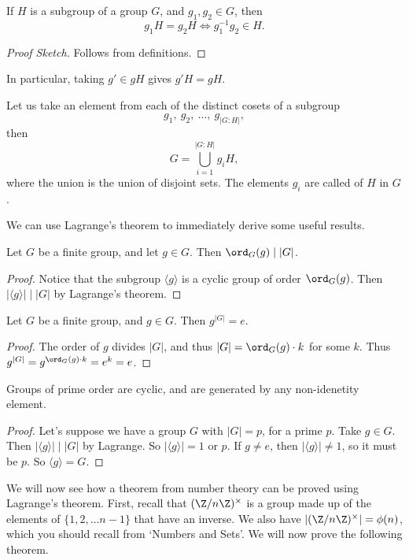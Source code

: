 \documentclass[a4]{scrreprt}
\begin{document}
\begin{proposition}
	If $H$ is a subgroup of a group $G$, and $g_1, g_2 \in G$, then
	$$
	g_1 H = g_2H \iff g_1^{-1} g_2 \in H.
	$$
\end{proposition}
\begin{proof}[Proof Sketch]
	Follows from definitions.
\end{proof}

In particular, taking $g' \in gH$ gives $g'H = gH$.

Let us take an element from each of the distinct cosets of a subgroup
$$
g_1,\ g_2, \ \dots, \ g_{|G:H|},
$$
then
$$
G = \bigcup_{i = 1}^{|G:H|} g_i H,
$$
where the union is the union of disjoint sets. The elements $g_i$ are called  of $H$ in $G$. 

We can use Lagrange's theorem to immediately derive some useful results.

\begin{corollary}
	Let $G$ be a finite group, and let $g \in G$. Then $\ord_G(g) \mid |G|$.
\end{corollary}
\begin{proof}
	Notice that the subgroup $\langle g \rangle$ is a cyclic group of order $\ord_G(g)$. Then $|\langle g \rangle|  \mid |G|$ by Lagrange's theorem.
\end{proof}

\begin{corollary}
	Let $G$ be a finite group, and $g \in G$. Then $g^{|G|} = e$.
\end{corollary}
\begin{proof}
	The order of $g$ divides $|G|$, and thus $|G| = \ord_G(g) \cdot k$ for some $k$. Thus $g^{|G|} = g^{\ord_G(g) \cdot k} = e^k = e$.
\end{proof}

\begin{corollary}\label{cor:primecyclic}
	Groups of prime order are cyclic, and are generated by any non-idenetity element.
\end{corollary}
\begin{proof}
Let's suppose we have a group $G$ with $|G| = p$, for a prime $p$. Take $g \in G$. Then $|\langle g \rangle| \mid |G|$ by Lagrange. So $|\langle g \rangle | = 1$ or $p$. If $g \neq e$, then $|\langle g \rangle |\neq 1$, so it must be $p$. So $\langle g \rangle = G$. 
\end{proof}

We will now see how a theorem from number theory can be proved using Lagrange's theorem. First, recall that $(\Z/n\Z)^\times$ is a group made up of the elements of $\{1, 2, \dots n - 1\}$ that have an inverse. We also have $|(\Z/n\Z)^\times| = \phi(n)$, which you should recall from `Numbers and Sets'. We will now prove the following theorem.
\end{document}
